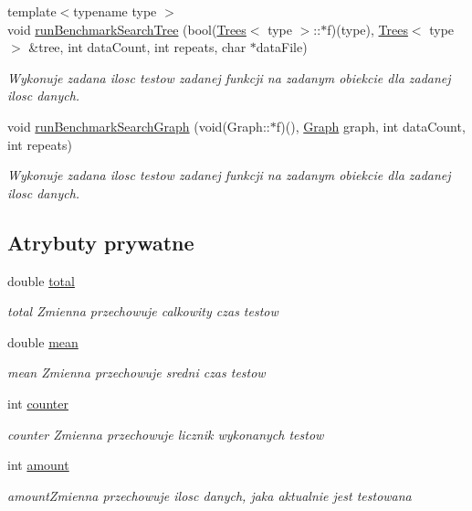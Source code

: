 \begin{DoxyCompactItemize}
{\footnotesize template$<$typename type $>$ }\\void \hyperlink{class_benchmark_a9e6b5ef8df351452be5fa0c8d127367a}{run\-Benchmark\-Search\-Tree} (bool(\hyperlink{class_trees}{Trees}$<$ type $>$\-::$\ast$f)(type), \hyperlink{class_trees}{Trees}$<$ type $>$ \&tree, int data\-Count, int repeats, char $\ast$data\-File)
\begin{DoxyCompactList}\small\item\em Wykonuje zadana ilosc testow zadanej funkcji na zadanym obiekcie dla zadanej ilosc danych. \end{DoxyCompactList}\item 
void \hyperlink{class_benchmark_ae9e23e7f4cf294fad57f5c98298bf874}{run\-Benchmark\-Search\-Graph} (void(Graph\-::$\ast$f)(), \hyperlink{class_graph}{Graph} graph, int data\-Count, int repeats)
\begin{DoxyCompactList}\small\item\em Wykonuje zadana ilosc testow zadanej funkcji na zadanym obiekcie dla zadanej ilosc danych. \end{DoxyCompactList}\end{DoxyCompactItemize}
\subsection*{Atrybuty prywatne}
\begin{DoxyCompactItemize}
\item 
double \hyperlink{class_benchmark_a7130c0718e3a3ab2fea70285dab122a2}{total}
\begin{DoxyCompactList}\small\item\em total Zmienna przechowuje calkowity czas testow \end{DoxyCompactList}\item 
double \hyperlink{class_benchmark_aa88092b6164ad7d1243162d3012f729a}{mean}
\begin{DoxyCompactList}\small\item\em mean Zmienna przechowuje sredni czas testow \end{DoxyCompactList}\item 
int \hyperlink{class_benchmark_a3a56c7dad0b21e490f3024d5d0027f31}{counter}
\begin{DoxyCompactList}\small\item\em counter Zmienna przechowuje licznik wykonanych testow \end{DoxyCompactList}\item 
int \hyperlink{class_benchmark_a1d0eaa6febe9b7a7f5f5147e83f60910}{amount}
\begin{DoxyCompactList}\small\item\em amount\-Zmienna przechowuje ilosc danych, jaka aktualnie jest testowana \end{DoxyCompactList}\end{DoxyCompactItemize}
